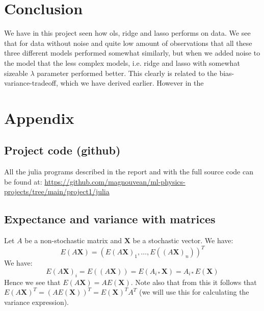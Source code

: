 \documentclass{article}
\begin{document}
\section{Conclusion}
We have in this project seen how ols, ridge and lasso performs on data. We see
that for data without noise and quite low amount of observations that all these
three different models performed somewhat similarly, but when we added noise to
the model that the less complex models, i.e. ridge and lasso with somewhat
sizeable $\lambda$ parameter performed better. This clearly is related to the
bias-variance-tradeoff, which we have derived earlier. However in the

\section{Appendix}

\subsection{Project code (github)}
All the julia programs described in the report and with the full source code can be
found at:
\url{https://github.com/magnouvean/ml-physics-projects/tree/main/project1/julia}

\subsection{Expectance and variance with matrices}
Let $A$ be a non-stochastic matrix and $\mathbf{X}$ be a stochastic vector. We have:
$$E(A \mathbf{X}) = (E(A \mathbf{X})_1, \dots, E((A \mathbf{X})_n))^T$$
We have:
$$E(A \mathbf{X})_i = E((A \mathbf{X})) = E(A_{i *} \mathbf{X}) = A_{i *} E(\mathbf{X})$$
Hence we see that $E(A \mathbf{X}) = A E(\mathbf{X})$.
Note also that from this it follows that $E(A \mathbf{X})^T = (A
    E(\mathbf{X}))^T = E(\mathbf{X})^T A^T$ (we will use this for calculating the
variance expression).
\end{document}
